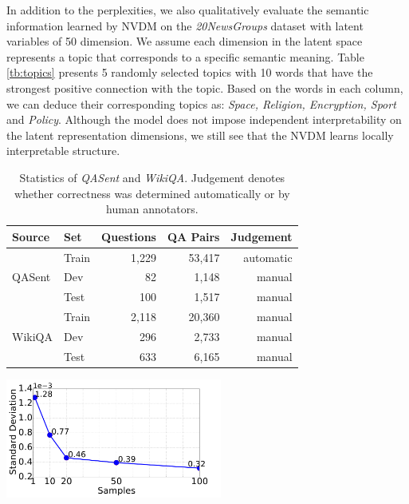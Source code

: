 \documentclass{article}
\begin{document}
In addition to the perplexities, we also qualitatively evaluate the semantic information learned by NVDM on the \textit{20NewsGroups} dataset with latent variables of 50 dimension. 
We assume each dimension in the latent space represents a topic that corresponds to a specific semantic meaning.
Table \ref{tb:topics} presents 5 randomly selected topics with 10 words that have the strongest positive connection with the topic.
Based on the words in each column, we can deduce their corresponding topics as: \textit{Space, Religion, Encryption, Sport} and \textit{Policy}. Although the model does not impose independent interpretability on the latent representation dimensions, we still see that the NVDM learns locally interpretable structure.
\begin{table}[t]
\begin{minipage}[b]{0.48\textwidth} 
  \begin{minipage}[b]{1\textwidth}        
  \centering
    \small
    \addtolength{\tabcolsep}{-2.0pt}
    \renewcommand{\arraystretch}{1.1}
	\begin{tabular}{@{}l|lrrr@{}}
			\toprule
			Source& Set &  Questions &  QA Pairs  & Judgement\\
			\hline
			&Train  & 1,229 & 53,417  & automatic \\
			QASent&Dev		   & 82	  & 1,148   & manual \\
			&Test	   & 100  & 1,517   & manual \\
			\hline
			&Train  & 2,118 & 20,360  & manual \\
			WikiQA&Dev		   & 296	  & 2,733   & manual \\
			&Test	   & 633  & 6,165   & manual \\
			\bottomrule
	\end{tabular}
	\caption{  Statistics of \textit{QASent} and \textit{WikiQA}. Judgement denotes whether correctness was determined automatically or by human annotators.
	}\label{dataset}
  \end{minipage}
   \begin{minipage}[b]{1\textwidth}   
  \centering
	\includegraphics[width=2.8in]{5_var.pdf}

\end{minipage}
\end{minipage}
\end{table}
\end{document}

